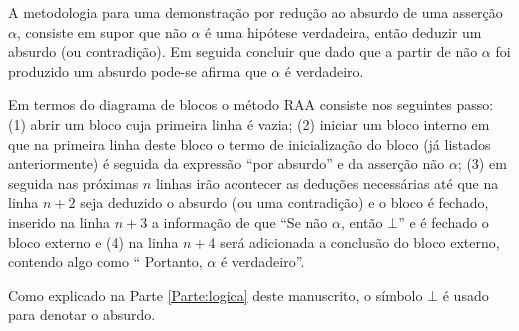 
\begin{definition}
	A metodologia para uma demonstração por redução ao absurdo de uma asserção $\alpha$, consiste em supor que não $\alpha$ é uma hipótese verdadeira, então deduzir um absurdo (ou contradição). Em seguida concluir que dado que a partir de não $\alpha$ foi produzido um absurdo pode-se afirma que $\alpha$ é verdadeiro.
\end{definition} 

Em termos do diagrama de blocos o método RAA consiste nos seguintes passo: (1) abrir um bloco  cuja primeira linha é vazia; (2) iniciar um bloco interno em que na primeira linha deste bloco o termo de inicialização do bloco (já listados anteriormente) é seguida da expressão ``por absurdo'' e da asserção não $\alpha$; (3) em seguida nas próximas $n$ linhas irão acontecer as deduções necessárias até que na linha $n+2$ seja deduzido o absurdo (ou uma contradição) e o bloco é fechado, inserido na linha $n +3$ a informação de que ``Se não $\alpha$, então $\bot$'' e é fechado o bloco externo e (4) na linha $n + 4$ será adicionada a conclusão do bloco externo, contendo algo como `` Portanto, $\alpha$ é verdadeiro''.

\begin{remark}
	Como explicado na Parte \ref{Parte:logica} deste manuscrito, o símbolo $\bot$ é usado para denotar o absurdo.
\end{remark}

